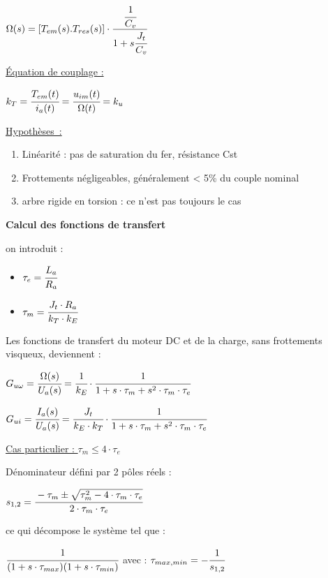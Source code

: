 \documentclass[	DIV=calc,%
							paper=a4,%
							fontsize=10pt,%
							twocolumn]{scrartcl} %
\newcounter{mycounter}
\newcommand{\formdesc}[1]{\noindent\textbf{#1} \addtocounter{mycounter}{1} \hfill \themycounter}
\newcommand{\formtitle}[1]{\noindent\underline{#1}}
\begin{document}
{\hfill $\Omega(s) = [T_{em}(s).T_{res}(s)] \cdot \cfrac{ \cfrac{1}{C_v}}{1+s\cfrac{J_t}{C_v}}  $\hfill}

\formtitle{Équation de couplage : }

{\hfill $k_T = \cfrac{T_{em}(t)}{i_a(t)} = \cfrac{u_{im}(t)}{\Omega(t) }= k_u$\hfill}

\formtitle{Hypothèses :}
\begin{enumerate}
    \item Linéarité : pas de saturation du fer, résistance Cst
    \item Frottements négligeables, généralement < 5\% du couple nominal
    \item arbre rigide en torsion : ce n’est pas toujours le cas
\end{enumerate}

\formdesc{Calcul des fonctions de transfert}

on introduit :
\begin{itemize}
    \item $\tau_e = \cfrac{L_a}{R_a}$
    \item $\tau_m = \cfrac{J_t\cdot R_a}{k_T\cdot k_E}$
\end{itemize}

Les fonctions de transfert du moteur DC et de la charge, sans frottements visqueux, deviennent :


{\hfill $G_{u\omega} = \cfrac{\Omega(s)}{U_a(s)} = \cfrac{1}{k_E}\cdot\cfrac{1}{1 + s \cdot \tau_m + s^2 \cdot \tau_m \cdot \tau_e} $\hfill}

\vspace{3mm}
{\hfill $G_{ui} = \cfrac{I_a(s)}{U_a(s)} = \cfrac{J_t}{k_E\cdot k_T}\cdot\cfrac{1}{1 + s \cdot \tau_m + s^2 \cdot \tau_m \cdot \tau_e} $\hfill}

\vspace{3mm}

\formtitle{Cas particulier : $\tau_m \leqslant 4 \cdot\tau_e$}

Dénominateur défini par 2 pôles réels :

\vspace{3mm}
{\hfill $s_{1,2} = \cfrac{-\tau_m \pm \sqrt{\tau_m^2 - 4 \cdot \tau_m \cdot \tau_e}}{2 \cdot \tau_m \cdot \tau_e} $\hfill}

\vspace{3mm}
ce qui décompose le système tel que : 

{\hfill $ \cfrac{1}{(1+s\cdot \tau_{max})(1+s\cdot \tau_{min})}$\hfill}
avec : {\hfill $\tau_{max,min} = -\cfrac{1}{s_{1,2}}$\hfill}
\end{document}

